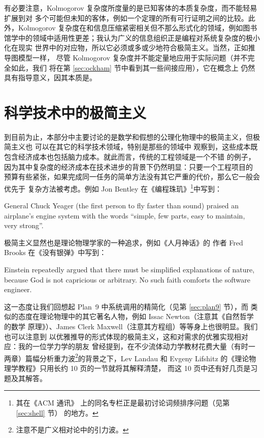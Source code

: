 有必要注意，Kolmogorov 复杂度所度量的是已知客体的本质复杂度，而不能轻易扩展到对
多个可能但未知的客体，例如一个定理的所有可行证明之间的比较。此外，Kolmogorov
复杂度在和信息压缩紧密相关但不那么形式化的领域，例如图书馆学中的领域中适用性更差；我认为广义的信息组织正是编程对系统复杂度的极小化在现实
世界中的对应物，所以它必须或多或少地符合极简主义。当然，正如推导图模型一样，
尽管 Kolmogorov 复杂度并不能定量地应用于实际问题（并不完全如此，我们
将在第 \ref{sec:ockham} 节中看到其一些间接应用），它在概念上
仍然具有指导意义，因其本质是。

\section{科学技术中的极简主义}\label{sec:science}

到目前为止，本部分中主要讨论的是数学和假想的公理化物理中的极简主义，但极简主义也
可以在其它的科学技术领域，特别是那些的领域中
观察到，这些成本既包含经济成本也包括脑力成本。就此而言，传统的工程领域是一个不错
的例子，因为其中复杂度的经济成本在技术进步的背景下仍然明显：只要一个工程项目的
预算有些紧张，如果完成同一任务的简单方法没有其它严重的代价，那么它一般会优先于
复杂方法被考虑。例如 Jon Bentley 在《编程珠玑》\footnote{其在《ACM 通讯》
上的同名专栏正是最初讨论词频排序问题（见第 \ref{sec:shell} 节）
的地方。}中写到：
\begin{quoting}
	General Chuck Yeager (the first person to fly faster than
	sound) praised an airplane's engine system with the words
	``simple, few parts, easy to maintain, very strong''.
\end{quoting}

极简主义显然也是理论物理学家的一种追求，例如《人月神话》的
作者 Fred Brooks 在《没有银弹》中写到：
\begin{quoting}
	Einstein repeatedly argued that there must be simplified
	explanations of nature, because God is not capricious or
	arbitrary.  No such faith comforts the software engineer.
\end{quoting}
这一态度让我们回想起 Plan~9 中系统调用的精简化（见第 \ref{sec:plan9} 节），而
类似的态度在理论物理中的其它著名人物，例如 Issac Newton（注意其《自然哲学的数学
原理》）、James Clerk Maxwell（注意其方程组）等等身上也很明显。我们也可以注意到
以优雅推导的形式体现的极简主义，这和对需求的优雅实现相对应：我的一位学力学的朋友
曾经提到，在不少流体动力学教材花费大量（有时一两章）篇幅分析重力波\footnote%
{注意不是广义相对论中的引力波。}的背景之下，Lev Landau 和 Evgeny Lifshitz
的《理论物理学教程》只用长约 10 页的一节就将其解释清楚，
而这 10 页中还有好几页是习题及其解答。

